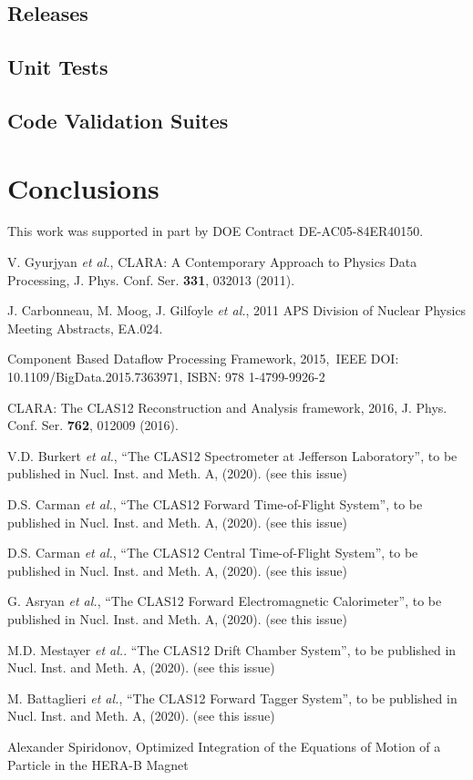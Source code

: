 \documentclass{elsart}
\begin{document}
\subsection{Releases}

\subsection{Unit Tests}

\subsection{Code Validation Suites}

\section{Conclusions}

\ack

This work was supported in part by DOE Contract DE-AC05-84ER40150.

\begin{thebibliography}{99}

V. Gyurjyan {\it et al.}, CLARA: A Contemporary Approach to Physics Data Processing, J. Phys. Conf. Ser.
{\bf 331}, 032013 (2011).

J. Carbonneau, M. Moog,  J. Gilfoyle {\it et al.}, 2011 APS Division of Nuclear Physics Meeting Abstracts, EA.024.

  Component Based Dataflow Processing Framework, 2015, IEEE DOI: 10.1109/BigData.2015.7363971,
  ISBN: 978 1-4799-9926-2

CLARA: The CLAS12 Reconstruction and Analysis framework, 2016, J. Phys. Conf. Ser. {\bf 762}, 012009 (2016).

V.D. Burkert {\it et al.}, ``The CLAS12 Spectrometer at Jefferson Laboratory'', to be published in Nucl.
Inst. and Meth. A, (2020). (see this issue)

D.S. Carman {\it et al.},   ``The CLAS12 Forward Time-of-Flight System'', to be published in Nucl.
Inst. and Meth. A, (2020). (see this issue)

D.S. Carman {\it et al.}, ``The CLAS12 Central Time-of-Flight System'', to be published in Nucl.
Inst. and Meth. A, (2020). (see this issue)

G. Asryan {\it et al.}, ``The CLAS12 Forward Electromagnetic Calorimeter'', to be published in Nucl.
Inst. and Meth. A, (2020). (see this issue)

M.D. Mestayer {\it et al.}. ``The CLAS12 Drift Chamber System'', to be published in Nucl. Inst. and
Meth. A, (2020). (see this issue)

M. Battaglieri {\it et al.}, ``The CLAS12 Forward Tagger System'', to be published in Nucl. Inst. and
Meth. A, (2020). (see this issue)

Alexander Spiridonov, Optimized Integration of the Equations of Motion of a Particle in the HERA-B Magnet

\end{thebibliography}
\end{document}
